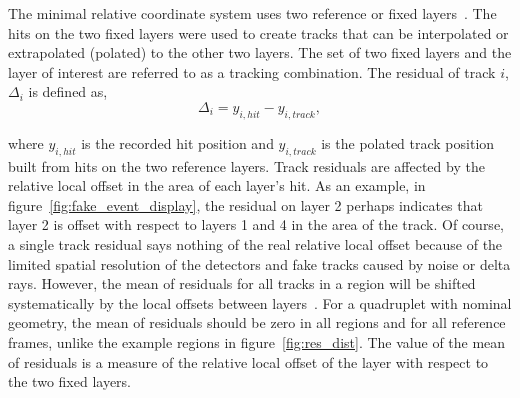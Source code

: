 
The minimal relative coordinate system uses two reference or fixed layers~\cite{lefebvre_thesis}. The hits on the two fixed layers were used to create tracks that can be interpolated or extrapolated (polated) to the other two layers. The set of two fixed layers and the layer of interest are referred to as a tracking combination. The residual of track $i$, $\Delta_i$ is defined as,
\begin{equation}
    \Delta_i = y_{i,hit} - y_{i,track},
    \label{eqn:residual}
\end{equation}

where $y_{i,hit}$ is the recorded hit position and $y_{i,track}$ is the polated track position built from hits on the two reference layers. Track residuals are affected by the relative local offset in the area of each layer's hit. As an example, in figure~\ref{fig:fake_event_display}, the residual on layer 2 perhaps indicates that layer 2 is offset with respect to layers 1 and 4 in the area of the track. Of course, a single track residual says nothing of the real relative local offset because of the limited spatial resolution of the detectors and fake tracks caused by noise or delta rays. However, the mean of residuals for all tracks in a region will be shifted systematically by the local offsets between layers~\cite{lefebvre_thesis}. For a quadruplet with nominal geometry, the mean of residuals should be zero in all regions and for all reference frames, unlike the example regions in figure~\ref{fig:res_dist}. The value of the mean of residuals is a measure of the relative local offset of the layer with respect to the two fixed layers.

